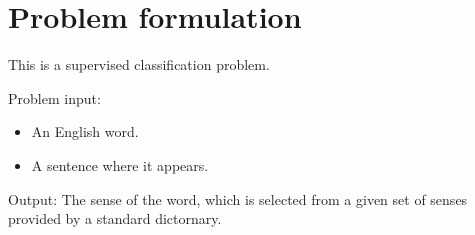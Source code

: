 \section{Problem formulation}

This is a supervised classification problem.

Problem input: 
\begin{itemize}
  \item An English word. 
  \item A sentence where it appears.
\end{itemize}
Output:
The sense of the word, which is selected from a given set of senses provided by
a standard dictornary.

